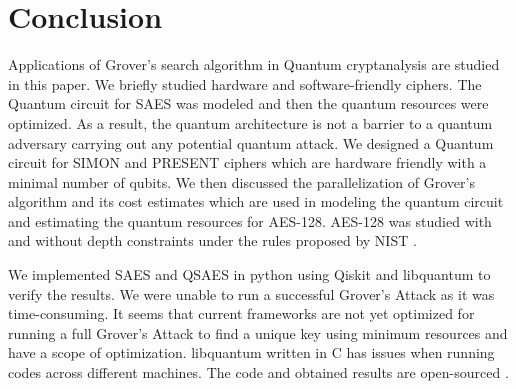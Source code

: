 \documentclass[preprint]{transcrypto}
\begin{document}
\section{Conclusion}\label{sec:con}
Applications of Grover's search algorithm in Quantum cryptanalysis are studied in this paper. We briefly studied hardware and software-friendly ciphers. The Quantum circuit for SAES was modeled and then the quantum resources were optimized. As a result, the quantum architecture is not a barrier to a quantum adversary carrying out any potential quantum attack. We designed a Quantum circuit for SIMON and PRESENT ciphers which are hardware friendly with a minimal number of qubits. We then discussed the parallelization of Grover's algorithm and its cost estimates which are used in modeling the quantum circuit and estimating the quantum resources for AES-128. AES-128 was studied with and without depth constraints under the rules proposed by NIST \cite{nist}.

We implemented SAES and QSAES in python using Qiskit\cite{Qiskit} and libquantum\cite{libquantum} to verify the results. We were unable to run a successful Grover's Attack as it was time-consuming. It seems that current frameworks are not yet optimized for running a full Grover's Attack to find a unique key using minimum resources and have a scope of optimization. libquantum written in C has issues when running codes across different machines. The code and obtained results are open-sourced \cite{Gopal}.



\printbibliography[title={References}] 


% 
% 
\end{document}
